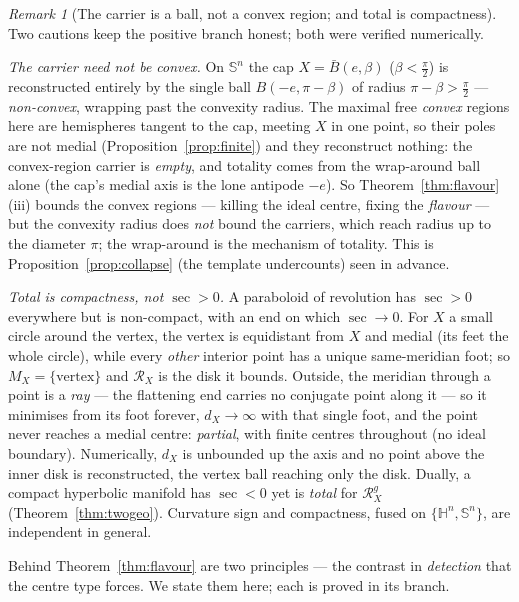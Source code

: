 \documentclass[11pt]{article}
\theoremstyle{remark}
\newtheorem{remark}[theorem]{Remark}
\newcommand{\X}{X}
\newcommand{\Mx}{M_{\X}}
\newcommand{\Rx}{\mathcal{R}_{\X}}
\newcommand{\sect}{\operatorname{sec}}
\newcommand{\HH}{\mathbb{H}}
\newcommand{\Sn}{\mathbb{S}^{n}}
\begin{document}
\begin{remark}[The carrier is a ball, not a convex region; and total is
compactness]\label{rem:carrier}
Two cautions keep the positive branch honest; both were verified
numerically.

\emph{The carrier need not be convex.} On $\Sn$ the cap
$\X=\bar B(e,\beta)$ ($\beta<\tfrac\pi2$) is reconstructed entirely by the
single ball $B(-e,\pi-\beta)$ of radius $\pi-\beta>\tfrac\pi2$ ---
\emph{non-convex}, wrapping past the convexity radius. The maximal free
\emph{convex} regions here are hemispheres tangent to the cap, meeting $\X$
in one point, so their poles are not medial
(Proposition~\ref{prop:finite}) and they reconstruct nothing: the
convex-region carrier is \emph{empty}, and totality comes from the
wrap-around ball alone (the cap's medial axis is the lone antipode $-e$).
So Theorem~\ref{thm:flavour}(iii) bounds the convex regions --- killing
the ideal centre, fixing the \emph{flavour} --- but the convexity radius
does \emph{not} bound the carriers, which reach radius up to the diameter
$\pi$; the wrap-around is the mechanism of totality. This is
Proposition~\ref{prop:collapse} (the template undercounts) seen in advance.

\emph{Total is compactness, not $\sect>0$.} A paraboloid of revolution has
$\sect>0$ everywhere but is non-compact, with an end on which $\sect\to0$.
For $\X$ a small circle around the vertex, the vertex is equidistant from
$\X$ and medial (its feet the whole circle), while every \emph{other}
interior point has a unique same-meridian foot; so $\Mx=\{\text{vertex}\}$
and $\Rx$ is the disk it bounds. Outside, the meridian through a point is a
\emph{ray} --- the flattening end carries no conjugate point along it ---
so it minimises from its foot forever, $d_{\X}\to\infty$ with that single
foot, and the point never reaches a medial centre: \emph{partial}, with
finite centres throughout (no ideal boundary). Numerically, $d_{\X}$ is
unbounded up the axis and no point above the inner disk is reconstructed,
the vertex ball reaching only the disk. Dually, a compact hyperbolic
manifold has $\sect<0$ yet is \emph{total} for $\Rx^{g}$
(Theorem~\ref{thm:twogeo}). Curvature sign and compactness, fused on
$\{\HH^{n},\Sn\}$, are independent in general.
\end{remark}

Behind Theorem~\ref{thm:flavour} are two principles --- the contrast in
\emph{detection} that the centre type forces. We state them here; each is
proved in its branch.
\end{document}

